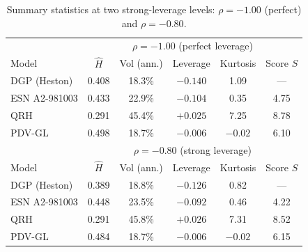 \documentclass[11pt,a4paper]{article}
\begin{document}
\begin{table}[h]
\centering
\caption{Summary statistics at two strong-leverage levels: $\rho=-1.00$ (perfect) and $\rho=-0.80$.}
\label{tab:summary}
\begin{tabular}{@{}lccccc@{}}
\toprule
 & \multicolumn{5}{c}{$\rho=-1.00$ (perfect leverage)} \\
Model & $\hat H$ & Vol (ann.) & Leverage & Kurtosis & Score $S$ \\
\midrule
DGP (Heston) & 0.408 & 18.3\% & $-0.140$ & 1.09 & --- \\
ESN A2-981003 & 0.433 & 22.9\% & $-0.104$ & 0.35 & 4.75 \\
QRH & 0.291 & 45.4\% & $+0.025$ & 7.25 & 8.78 \\
PDV-GL & 0.498 & 18.7\% & $-0.006$ & $-0.02$ & 6.10 \\
\midrule
 & \multicolumn{5}{c}{$\rho=-0.80$ (strong leverage)} \\
Model & $\hat H$ & Vol (ann.) & Leverage & Kurtosis & Score $S$ \\
\midrule
DGP (Heston) & 0.389 & 18.8\% & $-0.126$ & 0.82 & --- \\
ESN A2-981003 & 0.448 & 23.5\% & $-0.092$ & 0.46 & 4.22 \\
QRH & 0.291 & 45.8\% & $+0.026$ & 7.31 & 8.52 \\
PDV-GL & 0.484 & 18.7\% & $-0.006$ & $-0.02$ & 6.15 \\
\bottomrule
\end{tabular}
\end{table}
\end{document}
